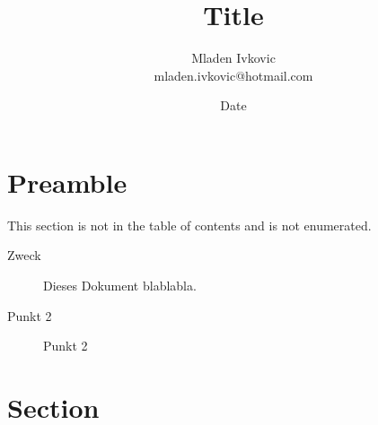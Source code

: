 \documentclass[12pt, a4paper, twopage]{scrartcl}
\title{Title}
\author{Mladen Ivkovic\\
mladen.ivkovic@hotmail.com\\
}
\date{Date}
\begin{document}
		
		
\nocite{*} %
		
		






\maketitle
\clearpage

\tableofcontents %
\clearpage







\section*{Preamble}

This section is not in the table of contents and is not enumerated.


\begin{description}
  \item[Zweck] Dieses Dokument blablabla.
  \item[Punkt 2] Punkt 2
\end{description}


\clearpage




















\section{Section}





\end{document}
